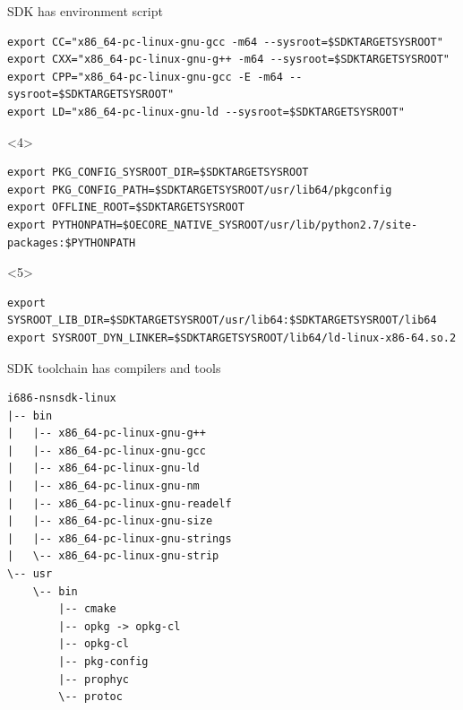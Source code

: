 \documentclass{beamer}
\begin{document}
\begin{frame}[fragile, t]{SDK has environment script}
\begin{onlyenv}
\begin{lstlisting}[style=TinyConsole]
export CC="x86_64-pc-linux-gnu-gcc -m64 --sysroot=$SDKTARGETSYSROOT"
export CXX="x86_64-pc-linux-gnu-g++ -m64 --sysroot=$SDKTARGETSYSROOT"
export CPP="x86_64-pc-linux-gnu-gcc -E -m64 --sysroot=$SDKTARGETSYSROOT"
export LD="x86_64-pc-linux-gnu-ld --sysroot=$SDKTARGETSYSROOT"
\end{lstlisting}
    \end{onlyenv}
    \begin{onlyenv}<4>
\begin{lstlisting}[style=TinyConsole]
export PKG_CONFIG_SYSROOT_DIR=$SDKTARGETSYSROOT
export PKG_CONFIG_PATH=$SDKTARGETSYSROOT/usr/lib64/pkgconfig
export OFFLINE_ROOT=$SDKTARGETSYSROOT
export PYTHONPATH=$OECORE_NATIVE_SYSROOT/usr/lib/python2.7/site-packages:$PYTHONPATH
\end{lstlisting}
    \end{onlyenv}
    \begin{onlyenv}<5>
\begin{lstlisting}[style=TinyConsole]
export SYSROOT_LIB_DIR=$SDKTARGETSYSROOT/usr/lib64:$SDKTARGETSYSROOT/lib64
export SYSROOT_DYN_LINKER=$SDKTARGETSYSROOT/lib64/ld-linux-x86-64.so.2
\end{lstlisting}
    \end{onlyenv}
\end{frame}

\begin{frame}[fragile]{SDK toolchain has compilers and tools}
\begin{lstlisting}[style=Console]
i686-nsnsdk-linux
|-- bin
|   |-- x86_64-pc-linux-gnu-g++
|   |-- x86_64-pc-linux-gnu-gcc
|   |-- x86_64-pc-linux-gnu-ld
|   |-- x86_64-pc-linux-gnu-nm
|   |-- x86_64-pc-linux-gnu-readelf
|   |-- x86_64-pc-linux-gnu-size
|   |-- x86_64-pc-linux-gnu-strings
|   \-- x86_64-pc-linux-gnu-strip
\-- usr
    \-- bin
        |-- cmake
        |-- opkg -> opkg-cl
        |-- opkg-cl
        |-- pkg-config
        |-- prophyc
        \-- protoc
\end{lstlisting}
\end{frame}
\end{document}
